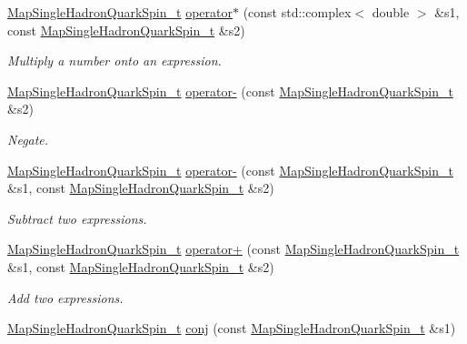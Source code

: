 \begin{DoxyCompactItemize}
\mbox{\hyperlink{namespaceHadron_a22279e56b59508dc8dd2c8991dc911fd}{Map\+Single\+Hadron\+Quark\+Spin\+\_\+t}} \mbox{\hyperlink{namespaceHadron_ab9e06323f5f25fbcb53926b3898935a6}{operator$\ast$}} (const std\+::complex$<$ double $>$ \&s1, const \mbox{\hyperlink{namespaceHadron_a22279e56b59508dc8dd2c8991dc911fd}{Map\+Single\+Hadron\+Quark\+Spin\+\_\+t}} \&s2)
\begin{DoxyCompactList}\small\item\em Multiply a number onto an expression. \end{DoxyCompactList}\item 
\mbox{\hyperlink{namespaceHadron_a22279e56b59508dc8dd2c8991dc911fd}{Map\+Single\+Hadron\+Quark\+Spin\+\_\+t}} \mbox{\hyperlink{namespaceHadron_af6e03647b0a1cac007a84d630c583dcb}{operator-\/}} (const \mbox{\hyperlink{namespaceHadron_a22279e56b59508dc8dd2c8991dc911fd}{Map\+Single\+Hadron\+Quark\+Spin\+\_\+t}} \&s2)
\begin{DoxyCompactList}\small\item\em Negate. \end{DoxyCompactList}\item 
\mbox{\hyperlink{namespaceHadron_a22279e56b59508dc8dd2c8991dc911fd}{Map\+Single\+Hadron\+Quark\+Spin\+\_\+t}} \mbox{\hyperlink{namespaceHadron_a47e695607c9fe7e70da22c43d0065b91}{operator-\/}} (const \mbox{\hyperlink{namespaceHadron_a22279e56b59508dc8dd2c8991dc911fd}{Map\+Single\+Hadron\+Quark\+Spin\+\_\+t}} \&s1, const \mbox{\hyperlink{namespaceHadron_a22279e56b59508dc8dd2c8991dc911fd}{Map\+Single\+Hadron\+Quark\+Spin\+\_\+t}} \&s2)
\begin{DoxyCompactList}\small\item\em Subtract two expressions. \end{DoxyCompactList}\item 
\mbox{\hyperlink{namespaceHadron_a22279e56b59508dc8dd2c8991dc911fd}{Map\+Single\+Hadron\+Quark\+Spin\+\_\+t}} \mbox{\hyperlink{namespaceHadron_a9ca80acd77b748f912b330709f8c294a}{operator+}} (const \mbox{\hyperlink{namespaceHadron_a22279e56b59508dc8dd2c8991dc911fd}{Map\+Single\+Hadron\+Quark\+Spin\+\_\+t}} \&s1, const \mbox{\hyperlink{namespaceHadron_a22279e56b59508dc8dd2c8991dc911fd}{Map\+Single\+Hadron\+Quark\+Spin\+\_\+t}} \&s2)
\begin{DoxyCompactList}\small\item\em Add two expressions. \end{DoxyCompactList}\item 
\mbox{\hyperlink{namespaceHadron_a22279e56b59508dc8dd2c8991dc911fd}{Map\+Single\+Hadron\+Quark\+Spin\+\_\+t}} \mbox{\hyperlink{namespaceHadron_a5b62c8e194d4e04483d980199eff43fa}{conj}} (const \mbox{\hyperlink{namespaceHadron_a22279e56b59508dc8dd2c8991dc911fd}{Map\+Single\+Hadron\+Quark\+Spin\+\_\+t}} \&s1)

\end{DoxyCompactItemize}
